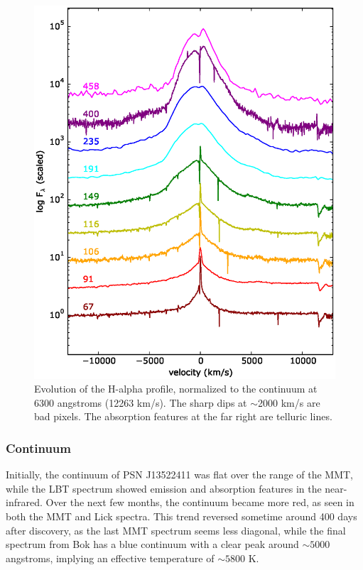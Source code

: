 \documentclass[iop]{emulateapj}
\begin{document}
\begin{figure}
  \includegraphics[width=\linewidth]{graphics/H_alpha.eps}
  \caption{Evolution of the H-alpha profile, normalized to the continuum at 6300 angstroms (12263 km/s). The sharp dips at $\sim$2000 km/s are bad pixels. The absorption features at the far right are telluric lines.}
  \label{fig:H-alpha}
\end{figure}

\subsubsection{Continuum} \label{analysis:spec:cont}
Initially, the continuum of PSN J13522411 was flat over the range of the MMT, while the LBT spectrum showed emission and absorption features in the near-infrared. Over the next few months, the continuum became more red, as seen in both the MMT and Lick spectra. This trend reversed sometime around 400 days after discovery, as the last MMT spectrum seems less diagonal, while the final spectrum from Bok has a blue continuum with a clear peak around $\sim5000$ angstroms, implying an effective temperature of $\sim5800$ K.
\end{document}
